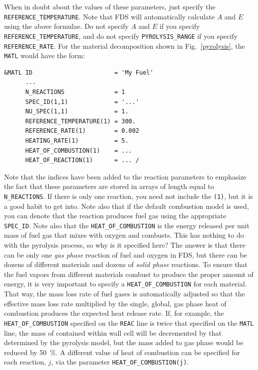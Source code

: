 \documentclass[11pt]{book}
\newcommand{\ct}{\tt\small}
\begin{document}
When in doubt about the values of
these parameters, just specify the {\ct REFERENCE\_TEMPERATURE}.
Note that FDS will automatically calculate $A$ and $E$ using the above formulae.
Do not specify $A$ and $E$ if you specify {\ct REFERENCE\_TEMPERATURE}, and do not specify {\ct PYROLYSIS\_RANGE} if you
specify {\ct REFERENCE\_RATE}.
For the material decomposition shown in Fig.~\ref{pyrolysis}, the {\ct MATL} would have the form:

\footnotesize
\begin{verbatim}
&MATL ID                       = 'My Fuel'
      ...
      N_REACTIONS              = 1
      SPEC_ID(1,1)             = '...'
      NU_SPEC(1,1)             = 1.
      REFERENCE_TEMPERATURE(1) = 300.
      REFERENCE_RATE(1)        = 0.002
      HEATING_RATE(1)          = 5.
      HEAT_OF_COMBUSTION(1)    = ...
      HEAT_OF_REACTION(1)      = ... /
\end{verbatim}
\normalsize

\noindent
Note that the indices have been added to the reaction parameters to
emphasize the fact that these parameters are stored in arrays of
length equal to {\ct N\_REACTIONS}. If there is only one reaction, you
need not include the {\ct (1)}, but it is a good habit to get into.
Note also that if the default combustion model is used, you can denote that the reaction
produces fuel gas using the appropriate {\ct SPEC\_ID}.
Note also that the {\ct HEAT\_OF\_COMBUSTION} is the energy released
per unit mass of fuel gas that mixes with oxygen and combusts.  This
has nothing to do with the pyrolysis process, so why is it specified
here? The answer is that there can be only one {\em gas phase}
reaction of fuel and oxygen in FDS, but there can be dozens of
different materials and dozens of {\em solid phase} reactions. To
ensure that the fuel vapors from different materials combust to
produce the proper amount of energy, it is very important to specify a
{\ct HEAT\_OF\_COMBUSTION} for each material. That way, the mass loss
rate of fuel gases is automatically adjusted so that the effective
mass loss rate multiplied by the single, global, gas phase heat of
combustion produces the expected heat release rate.
If, for example, the {\ct HEAT\_OF\_COMBUSTION} specified on the {\ct REAC} line is twice that
specified on the {\ct MATL} line, the mass of contained within wall
cell will be decremented by that determined by the pyrolysis model,
but the mass added to gas phase would be reduced by 50~\%. A different
value of heat of combustion can be specified for each reaction, $j$, via the parameter {\ct HEAT\_OF\_COMBUSTION(j)}.
\end{document}

